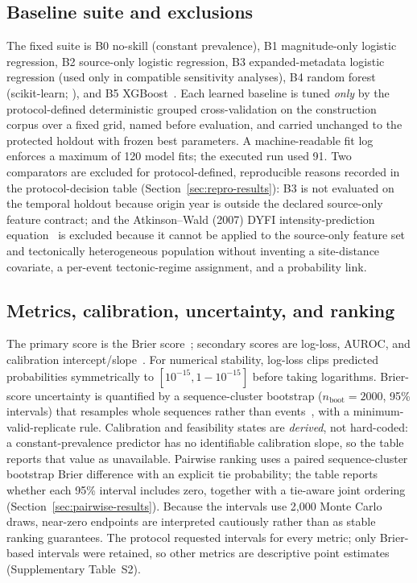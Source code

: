 \documentclass[pdflatex,sn-basic,Numbered]{sn-jnl}
\begin{document}
\subsection{Baseline suite and exclusions}\label{sec:baselines}

The fixed suite is B0 no-skill (constant prevalence), B1 magnitude-only logistic
regression, B2 source-only logistic regression, B3 expanded-metadata logistic
regression (used only in compatible sensitivity analyses), B4 random forest
(scikit-learn;
\citealp{pedregosa2011sklearn}), and B5 XGBoost~\citep{chen2016xgboost}. Each learned
baseline is tuned \emph{only} by the protocol-defined deterministic grouped
cross-validation on the construction corpus over a fixed grid, named before
evaluation, and carried unchanged to the protected holdout with frozen
best parameters. A machine-readable fit log enforces a maximum of 120 model
fits; the executed run used 91. Two comparators are excluded for protocol-defined,
reproducible reasons recorded in the protocol-decision table
(Section~\ref{sec:repro-results}): B3 is not evaluated on the temporal holdout
because origin year is outside the declared source-only feature contract; and
the Atkinson--Wald (2007) DYFI intensity-prediction
equation~\citep{atkinson2007dyfi} is excluded because it cannot be applied to
the source-only feature set and tectonically heterogeneous population without
inventing a site-distance covariate, a per-event tectonic-regime assignment, and
a probability link.

\subsection{Metrics, calibration, uncertainty, and ranking}\label{sec:metrics}

The primary score is the Brier score~\citep{brier1950}; secondary scores are
log-loss, AUROC, and calibration intercept/slope~\citep{vancalster2019calibration}.
For numerical stability, log-loss clips predicted probabilities symmetrically
to $[10^{-15},1-10^{-15}]$ before taking logarithms.
Brier-score uncertainty is quantified by a sequence-cluster bootstrap
($n_{\text{boot}}=2000$, 95\% intervals) that resamples whole sequences rather
than events~\citep{field2007bootstrap}, with a minimum-valid-replicate rule.
Calibration and feasibility states are \emph{derived}, not hard-coded: a
constant-prevalence predictor has no identifiable calibration slope, so the
table reports that value as unavailable. Pairwise ranking uses a paired
sequence-cluster bootstrap Brier difference with an explicit tie probability;
the table reports whether each 95\% interval includes zero, together with a
tie-aware joint ordering (Section~\ref{sec:pairwise-results}). Because the
intervals use 2{,}000 Monte Carlo draws, near-zero endpoints are interpreted
cautiously rather than as stable ranking guarantees.
The protocol requested intervals for every metric; only Brier-based intervals
were retained, so other metrics are descriptive point estimates
(Supplementary Table~S2).
\end{document}
